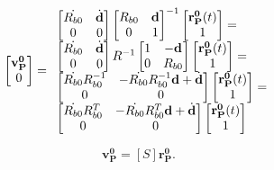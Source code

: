 \documentclass{article}
\begin{document}
 
 \begin{equation}
\begin{bmatrix} \mathbf{v^0_P} \\ 0\end{bmatrix} = \\
\begin{array}{l}
\begin{bmatrix} \dot{R_{b0}} & \dot{\textbf{d}} \\ 0 & 0 \end{bmatrix}
\begin{bmatrix} R_{b0} & \textbf{d} \\ 0 & 1 \end{bmatrix}^{-1}
\begin{bmatrix} \mathbf{r^0_P}(t) \\ 1\end{bmatrix}  = \\
\begin{bmatrix} \dot{R_{b0}} & \dot{\textbf{d}} \\ 0 & 0 \end{bmatrix}
R^{-1}\begin{bmatrix} 1 & -\textbf{d} \\ 0 & R_{b0} \end{bmatrix}
\begin{bmatrix} \mathbf{r^0_P}(t) \\ 1\end{bmatrix}  = \\
\begin{bmatrix} \dot{R_{b0}}R_{b0}^{-1} & -\dot{R_{b0}}R_{b0}^{-1}\textbf{d} + \dot{\textbf{d}} \\ 0 & 0 \end{bmatrix}
\begin{bmatrix} \mathbf{r^0_P}(t) \\ 1\end{bmatrix}  = \\
\begin{bmatrix} \dot{R_{b0}}R_{b0}^T & -\dot{R_{b0}}R_{b0}^T\textbf{d} + \dot{\textbf{d}} \\ 0 & 0 \end{bmatrix}
\begin{bmatrix} \mathbf{r^0_P}(t) \\ 1\end{bmatrix} 
\end{array}
\end{equation}
 
 \begin{equation}
\mathbf{v^0_P}  = [S]\mathbf{r^0_P}.
\end{equation}
\end{document}
